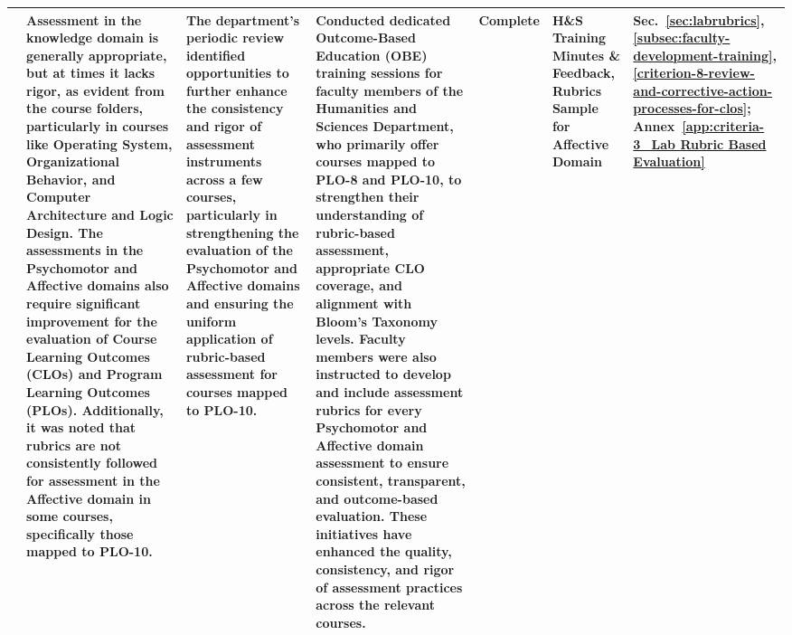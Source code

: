 \begin{landscape}
\begin{longtable}{|P{2.3cm}|P{5.0cm}|P{4.5cm}|P{5.0cm}|P{2.4cm}|P{2.8cm}|P{1.8cm}|}
 & Assessment in the knowledge domain is generally appropriate, but at times it lacks rigor, as evident from the course folders, particularly in courses like Operating System, Organizational Behavior, and Computer Architecture and Logic Design. The assessments in the Psychomotor and Affective domains also require significant improvement for the evaluation of Course Learning Outcomes (CLOs) and Program Learning Outcomes (PLOs). Additionally, it was noted that rubrics are not consistently followed for assessment in the Affective domain in some courses, specifically those mapped to PLO-10. & The department's periodic review identified opportunities to further enhance the consistency and rigor of assessment instruments across a few courses, particularly in strengthening the evaluation of the Psychomotor and Affective domains and ensuring the uniform application of rubric-based assessment for courses mapped to PLO-10. & Conducted dedicated Outcome-Based Education (OBE) training sessions for faculty members of the Humanities and Sciences Department, who primarily offer courses mapped to PLO-8 and PLO-10, to strengthen their understanding of rubric-based assessment, appropriate CLO coverage, and alignment with Bloom's Taxonomy levels. Faculty members were also instructed to develop and include assessment rubrics for every Psychomotor and Affective domain assessment to ensure consistent, transparent, and outcome-based evaluation. These initiatives have enhanced the quality, consistency, and rigor of assessment practices across the relevant courses. & Complete & H\&S Training Minutes \& Feedback, Rubrics Sample for Affective Domain & Sec.~\ref{sec:labrubrics}, \ref{subsec:faculty-development-training}, \ref{criterion-8-review-and-corrective-action-processes-for-clos}; Annex~\ref{app:criteria-3_Lab Rubric Based Evaluation} \\ \hline

\end{longtable}
\end{landscape}
